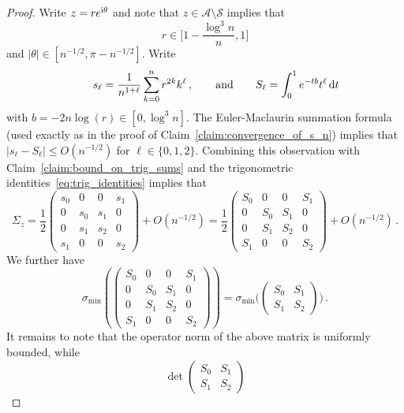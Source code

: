 \documentclass[11pt]{amsart}
\theoremstyle{remark}
\theoremstyle{definition}
\newcommand{\cA}{\mathcal A}
\newcommand{\I}{{\rm i}}
\begin{document}
    \begin{proof}
        Write $z=re^{\I\theta}$ and note that $z\in \cA\setminus \mathcal{S}$ implies that 
        \[
        r\in\Big[1-\frac{\log^3 n}{n},1\Big] 
        \]
        and $|\theta|\in[n^{-1/2},\pi-n^{-1/2}]$. Write
        \[
        \qquad s_\ell = \frac{1}{n^{1+\ell}} \sum_{k=0}^{n} r^{2k} k^\ell \, , \qquad \text{and} \qquad S_\ell = \int_0^{1}e^{-tb}t^\ell  \, {\rm d}t
        \]
        with $b= -2n\log(r)\in[0,\log^3n]$. The Euler-Maclaurin summation formula (used exactly as in the proof of Claim~\ref{claim:convergence_of_s_n}) implies that $|s_\ell - S_\ell| \le O(n^{-1/2})$ for $\ell\in\{0,1,2\}$. Combining this observation with Claim~\ref{claim:bound_on_trig_sums} and the trigonometric identities~\eqref{eq:trig_identities} implies that
        \begin{equation}
            \label{eq:asymptotic_for_sigma_z}
            \Sigma_z = \frac{1}{2}\begin{pmatrix}
                s_0 & 0 & 0& s_1 \\ 0& s_0 & s_1 & 0 \\ 0 & s_1 & s_2& 0 \\ s_1 & 0 & 0 & s_2
            \end{pmatrix} + O(n^{-1/2}) = \frac{1}{2}\begin{pmatrix}
                S_0 & 0 & 0& S_1 \\ 0& S_0 & S_1 & 0 \\ 0 & S_1 & S_2& 0 \\ S_1 & 0 & 0 & S_2
            \end{pmatrix} + O(n^{-1/2}) \, .
        \end{equation} 
        We further have
        \[
        \sigma_{\min} \left(\begin{pmatrix}
                S_0 & 0 & 0& S_1 \\ 0& S_0 & S_1 & 0 \\ 0 & S_1 & S_2& 0 \\ S_1 & 0 & 0 & S_2
            \end{pmatrix} \right) = \sigma_{\min}\bigg(\begin{pmatrix}
                S_0 & S_1 \\ S_1 & S_2
            \end{pmatrix}\bigg) \, .
        \]
        It remains to note that the operator norm of the above matrix is uniformly bounded, while 
         \[
        \det\begin{pmatrix}
            S_0 & S_1 \\ S_1 & S_2

\end{pmatrix}\]
\end{proof}
\end{document}
